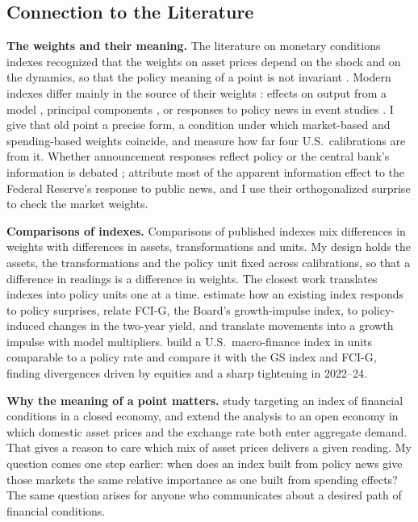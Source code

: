 \documentclass[11pt]{article}
\begin{document}
\subsection{Connection to the Literature}
\textbf{The weights and their meaning.} The literature on monetary conditions indexes recognized that the weights on asset prices depend on the shock and on the dynamics, so that the policy meaning of a point is not invariant \citep{eika1996}. Modern indexes differ mainly in the source of their weights \citep{hatzius2010}: effects on output from a model \citep{dudley2000,hatzius2018,ajello2023}, principal components \citep{brave2011}, or responses to policy news in event studies \citep{kuttner2001,gurkaynak2005,bernanke2005,nakamura2018,bauer2023}. I give that old point a precise form, a condition under which market-based and spending-based weights coincide, and measure how far four U.S.\ calibrations are from it. Whether announcement responses reflect policy or the central bank's information is debated \citep{nakamura2018}; \citet{bauer2023aer} attribute most of the apparent information effect to the Federal Reserve's response to public news, and I use their orthogonalized surprise to check the market weights.

\textbf{Comparisons of indexes.} Comparisons of published indexes mix differences in weights with differences in assets, transformations and units. My design holds the assets, the transformations and the policy unit fixed across calibrations, so that a difference in readings is a difference in weights. The closest work translates indexes into policy units one at a time. \citet{arnaut2024} estimate how an existing index responds to policy surprises, \citet{sack2023} relate FCI-G, the Board's growth-impulse index, to policy-induced changes in the two-year yield, and \citet{ajello2023} translate movements into a growth impulse with model multipliers. \citet{bletzinger2026} build a U.S.\ macro-finance index in units comparable to a policy rate and compare it with the GS index and FCI-G, finding divergences driven by equities and a sharp tightening in 2022--24.

\textbf{Why the meaning of a point matters.} \citet{caballero2024} study targeting an index of financial conditions in a closed economy, and \citet{caballero2026b} extend the analysis to an open economy in which domestic asset prices and the exchange rate both enter aggregate demand. That gives a reason to care which mix of asset prices delivers a given reading. My question comes one step earlier: when does an index built from policy news give those markets the same relative importance as one built from spending effects? The same question arises for anyone who communicates about a desired path of financial conditions.
\end{document}
